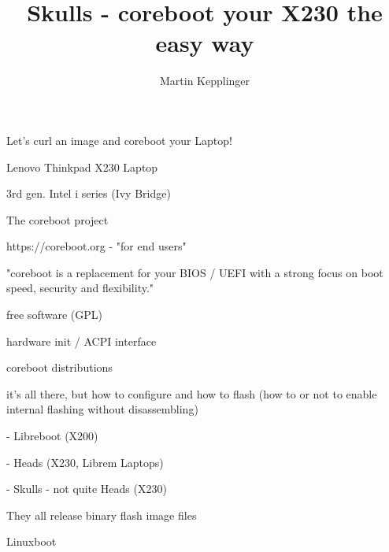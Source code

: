 \documentclass[14pt]{beamer}
\title{Skulls - coreboot your X230 the easy way}
\author{Martin Kepplinger}
\begin{document}
\begin{frame}
\titlepage
\end{frame}


\begin{frame}
Let's curl an image and coreboot your Laptop!
\end{frame}

\begin{frame}
Lenovo Thinkpad X230 Laptop
\end{frame}


\begin{frame}
3rd gen. Intel i series (Ivy Bridge)


\end{frame}


\begin{frame}
The coreboot project
\end{frame}


\begin{frame}
https://coreboot.org - "for end users"

"coreboot is a replacement for your BIOS / UEFI with a strong focus on boot speed, security and flexibility."

free software (GPL)

hardware init / ACPI interface
\end{frame}

\begin{frame}
coreboot distributions
\end{frame}


\begin{frame}
it's all there, but how to configure and how to flash
(how to or not to enable internal flashing without disassembling)
\pause

- Libreboot (X200)

- Heads (X230, Librem Laptops)

- Skulls - not quite Heads (X230)

They all release binary flash image files
\end{frame}


\begin{frame}
Linuxboot
\end{frame}
\end{document}
